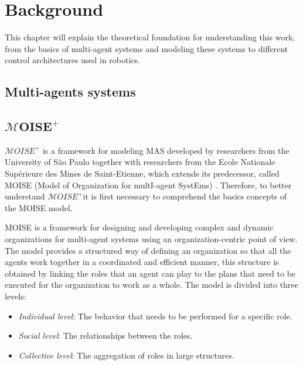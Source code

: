\def \MOISEp {$\mathcal{M}OISE^+$}
\def \MOISEpBf {$\mathbf{\mathcal{M}OISE^+}$}

\chapter{Background}
\label{ch:background}

This chapter will explain the theoretical foundation for understanding this work, from the basics of multi-agent systems and modeling these systems to different control architectures used in robotics.

\section{Multi-agents systems}



\section{\MOISEpBf}

\MOISEp \cite{MOISEp} is a framework for modeling MAS developed by researchers from the University of São Paulo together with researchers from the Ecole Nationale Supérieure des Mines de Saint-Etienne, which extends its predecessor, called MOISE (Model of Organization for multI-agent SystEms) \cite{Moise}. Therefore, to better understand \MOISEp it is first necessary to comprehend the basics concepts of the MOISE model.

MOISE is a framework for designing and developing complex and dynamic organizations for multi-agent systems using an organization-centric point of view. The model provides a structured way of defining an organization so that all the agents work together in a coordinated and efficient manner, this structure is obtained by linking the roles that an agent can play to the plans that need to be executed for the organization to work as a whole. The model is divided into three levels:

\begin{itemize}
    \item \textit{Individual level}: The behavior that needs to be performed for a specific role.
    \item \textit{Social level}: The relationships between the roles.
    \item \textit{Collective level}: The aggregation of roles in large structures.
\end{itemize}

